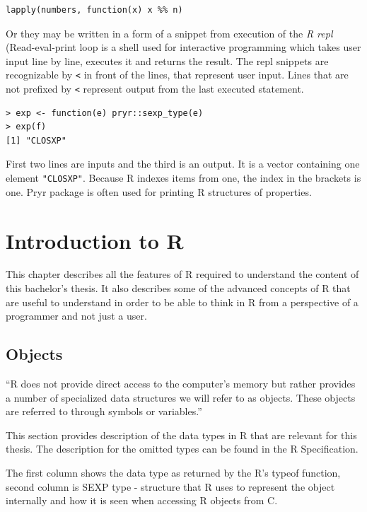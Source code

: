 \documentclass[thesis=B,english]{FITthesis}[2012/10/20]
\begin{document}
\begin{verbatim}
lapply(numbers, function(x) x %% n)
\end{verbatim}

Or they may be written in a form of a snippet from execution of the \emph{R repl} (Read-eval-print loop is a shell used for interactive programming which takes user input line by line, executes it and returns the result. The repl snippets are recognizable by \verb|<| in front of the lines, that represent user input. Lines that are not prefixed by \verb|<| represent output from the last executed statement.

\begin{verbatim}
> exp <- function(e) pryr::sexp_type(e)
> exp(f)
[1] "CLOSXP"

\end{verbatim}

First two lines are inputs and the third is an output. It is a vector containing one element \verb|"CLOSXP"|. Because R indexes items from one, the index in the brackets is one. Pryr package\cite{pryr} is often used for printing R structures of properties.


\chapter{Introduction to R}
This chapter describes all the features of R required to understand the content of this bachelor’s thesis. It also describes some of the advanced concepts of R that are useful to understand in order to be able to think in R from a perspective of a programmer and not just a user.

\section{Objects}
``R does not provide direct access to the computer’s memory but rather provides a number of specialized data structures we will refer to as objects. These objects are referred to through symbols or variables.'' \cite{specs}

This section provides description of the data types in R that are relevant for this thesis. The description for the omitted types can be found in the R Specification.

The first column shows the data type as returned by the R’s typeof function, second column is SEXP type - structure that R uses to represent the object internally and how it is seen when accessing R objects from C.
\end{document}
